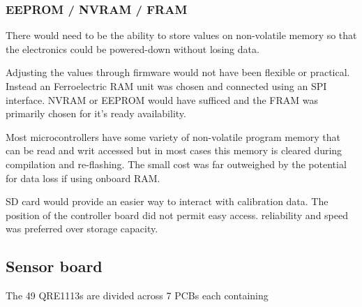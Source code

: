 \subsubsection{EEPROM / NVRAM / FRAM}\label{eeprom-nvram-fram}

There would need to be the ability to store values on non-volatile
memory so that the electronics could be powered-down without losing
data.

Adjusting the values through firmware would not have been flexible or
practical. Instead an Ferroelectric RAM unit was chosen and connected
using an SPI interface. NVRAM or EEPROM would have sufficed and the FRAM
was primarily chosen for it's ready availability.

Most microcontrollers have some variety of non-volatile program memory
that can be read and writ accessed but in most cases this memory is
cleared during compilation and re-flashing. The small cost was far
outweighed by the potential for data loss if using onboard RAM.




SD card would provide an easier way to interact with calibration data.
The position of the controller board did not permit easy access.
reliability and speed was preferred over storage capacity.

\subsection{Sensor board}\label{sensor-board}

The 49 QRE1113s are divided across 7 PCBs each containing

